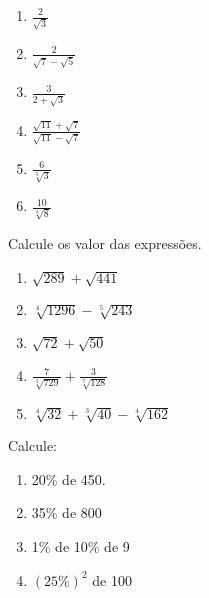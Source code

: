 	\begin{multicols}{2}
	\begin{enumerate}
		\item $\displaystyle\frac{2}{\sqrt{3}}$
		\item $\displaystyle\frac{2}{\sqrt{7}-\sqrt{5}}$
		\item $\displaystyle\frac{3}{2+\sqrt{3}}$
		\item $\displaystyle\frac{\sqrt{11} + \sqrt{7}}{\sqrt{11} - \sqrt{7}}$
		\item $\displaystyle\frac{6}{\sqrt[3]{3}}$
		\item $\displaystyle\frac{10}{\sqrt[4]{8}}$
	\end{enumerate}
	\end{multicols}
	\item Calcule os valor das expressões.
	\begin{multicols}{2}
	\begin{enumerate}
		\item $\sqrt{289}+\sqrt{441}$
		\item $\sqrt[4]{1296}-\sqrt[5]{243}$
		\item $\sqrt{72}+\sqrt{50}$
		\item $\displaystyle\frac{7}{\sqrt[3]{729}} + \frac{3}{\sqrt[7]{128}}$
		\item $\displaystyle\sqrt[4]{32} + \sqrt[3]{40} - \sqrt[4]{162}$
	\end{enumerate}
	\end{multicols}
	\item Calcule:
	\begin{multicols}{2}
	\begin{enumerate}
		\item 20\% de 450.
		\item 35\% de 800
		\item 1\% de 10\% de 9
		\item $(25\%)^2$ de 100
	\end{enumerate}
	\end{multicols}
